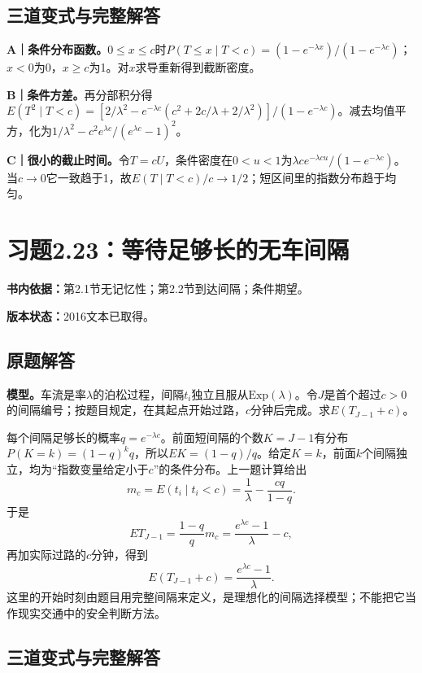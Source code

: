 \documentclass[
  11pt,
  a4paper,
  UTF8,fontset=fandol]{ctexart}
\let\OldSection\section
\renewcommand{\section}{\Needspace{7\baselineskip}\OldSection}
\let\OldSubsection\subsection
\renewcommand{\subsection}{\Needspace{5\baselineskip}\OldSubsection}
\begin{document}
\subsection{三道变式与完整解答}\label{ux4e09ux9053ux53d8ux5f0fux4e0eux5b8cux6574ux89e3ux7b54-21}

\textbf{A｜条件分布函数。}\(0\le x\le c\)时\(P(T\le x\mid T<c)=(1-e^{-\lambda x})/(1-e^{-\lambda c})\)；\(x<0\)为0，\(x\ge c\)为1。对\(x\)求导重新得到截断密度。

\textbf{B｜条件方差。}再分部积分得\(E(T^2\mid T<c)=[2/\lambda^2-e^{-\lambda c}(c^2+2c/\lambda+2/\lambda^2)]/(1-e^{-\lambda c})\)。减去均值平方，化为\(1/\lambda^2-c^2e^{\lambda c}/(e^{\lambda c}-1)^2\)。

\textbf{C｜很小的截止时间。}令\(T=cU\)，条件密度在\(0<u<1\)为\(\lambda c e^{-\lambda cu}/(1-e^{-\lambda c})\)。当\(c\to0\)它一致趋于1，故\(E(T\mid T<c)/c\to1/2\)；短区间里的指数分布趋于均匀。

\newpage

\section{习题2.23：等待足够长的无车间隔}\label{ux4e60ux98982.23ux7b49ux5f85ux8db3ux591fux957fux7684ux65e0ux8f66ux95f4ux9694}

\textbf{书内依据：}第2.1节无记忆性；第2.2节到达间隔；条件期望。

\textbf{版本状态：}2016文本已取得。

\subsection{原题解答}\label{ux539fux9898ux89e3ux7b54-22}

\textbf{模型。}车流是率\(\lambda\)的泊松过程，间隔\(t_i\)独立且服从\(\mathrm{Exp}(\lambda)\)。令\(J\)是首个超过\(c>0\)的间隔编号；按题目规定，在其起点开始过路，\(c\)分钟后完成。求\(E(T_{J-1}+c)\)。

每个间隔足够长的概率\(q=e^{-\lambda c}\)。前面短间隔的个数\(K=J-1\)有分布\(P(K=k)=(1-q)^kq\)，所以\(EK=(1-q)/q\)。给定\(K=k\)，前面\(k\)个间隔独立，均为``指数变量给定小于\(c\)''的条件分布。上一题计算给出
\[m_c=E(t_i\mid t_i<c)=\frac1\lambda-\frac{cq}{1-q}.\] 于是
\[E T_{J-1}=\frac{1-q}{q}m_c=\frac{e^{\lambda c}-1}{\lambda}-c,\]
再加实际过路的\(c\)分钟，得到
\[\boxed{E(T_{J-1}+c)=\frac{e^{\lambda c}-1}{\lambda}.}\]
这里的开始时刻由题目用完整间隔来定义，是理想化的间隔选择模型；不能把它当作现实交通中的安全判断方法。

\subsection{三道变式与完整解答}\label{ux4e09ux9053ux53d8ux5f0fux4e0eux5b8cux6574ux89e3ux7b54-22}
\end{document}
